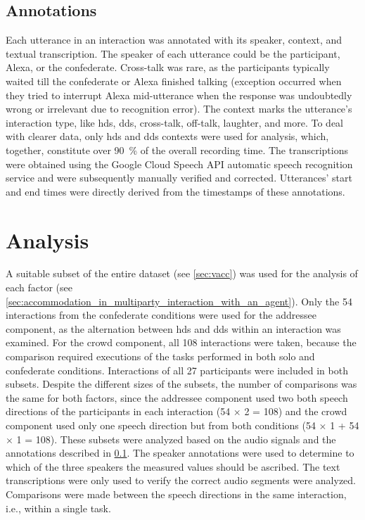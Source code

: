 \subsection{Annotations}
\label{subsec:annotations_hhci}

Each utterance in an interaction was annotated with its speaker, context, and textual transcription.
The speaker of each utterance could be the participant, Alexa, or the confederate.
Cross-talk was rare, as the participants typically waited till the confederate or Alexa finished talking (exception occurred when they tried to interrupt Alexa mid-utterance when the response was undoubtedly wrong or irrelevant due to recognition error).
The context marks the utterance's interaction type, like \ac{hds}, \ac{dds}, cross-talk, off-talk, laughter, and more.
To deal with clearer data, only \ac{hds} and \ac{dds} contexts were used for analysis, which, together, constitute over \SI{90}{\percent} of the overall recording time.
The transcriptions were obtained using the Google Cloud Speech API automatic speech recognition service and were subsequently manually verified and corrected.
Utterances' start and end times were directly derived from the timestamps of these annotations.

\section{Analysis}
\label{sec:analysis_hhci}

A suitable subset of the entire dataset (see \cref{sec:vacc}) was used for the analysis of each factor (see \cref{sec:accommodation_in_multiparty_interaction_with_an_agent}).
Only the 54 interactions from the confederate conditions were used for the addressee component, as the alternation between \ac{hds} and \ac{dds} within an interaction was examined.
For the crowd component, all 108 interactions were taken, because the comparison required executions of the tasks performed in both solo and confederate conditions.
Interactions of all 27 participants were included in both subsets.
Despite the different sizes of the subsets, the number of comparisons was the same for both factors, since the addressee component used two both speech directions of the participants in each interaction (54 $\times$ 2 = 108) and the crowd component used only one speech direction but from both conditions (54 $\times$ 1 + 54 $\times$ 1 = 108).
These subsets were analyzed based on the audio signals and the annotations described in \cref{subsec:annotations_hhci}.
The speaker annotations were used to determine to which of the three speakers the measured values should be ascribed.
The text transcriptions were only used to verify the correct audio segments were analyzed.
Comparisons were made between the speech directions in the same interaction, i.e., within a single task.

